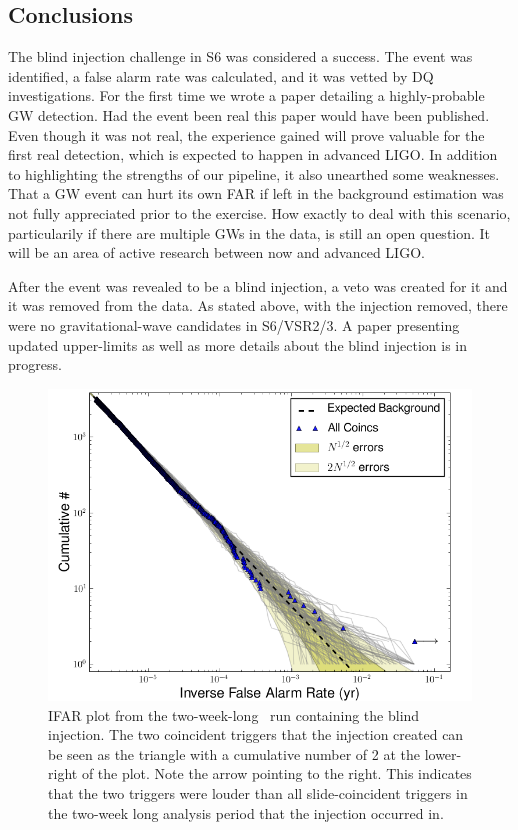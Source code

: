 \subsection{Conclusions}

The blind injection challenge in S6 was considered a success. The event was
identified, a false alarm rate was calculated, and it was vetted by \ac{DQ}
investigations. For the first time we wrote a paper detailing a highly-probable
\ac{GW} detection. Had the event been real this paper would have been
published. Even though it was not real, the experience gained will prove
valuable for the first real detection, which is expected to happen in  advanced
LIGO. In addition to highlighting the strengths of our pipeline, it also
unearthed some weaknesses. That a \ac{GW} event can hurt its own \ac{FAR} if
left in the background estimation was not fully appreciated prior to the
exercise. How exactly to deal with this scenario, particularily if there are
multiple \acp{GW} in the data, is still an open question. It will be an area of
active research between now and advanced LIGO.

After the event was revealed to be a blind injection, a veto was created for it
and it was removed from the data. As stated above, with the injection removed,
there were no gravitational-wave candidates in S6/VSR2/3. A paper presenting
updated upper-limits as well as more details about the blind injection is in
progress.

\begin{figure}[p]
\center
\includegraphics[width=6in]{figures/big_dog/H1L1V1-ligolw_cbc_plotifar_FULL_DATA_CAT_4_VETO_cumhist_combined_ifar_ALL_DATA_PLOTTED_OPEN_BOX-967593543-1209744.png}
\caption{IFAR plot from the two-week-long \ihope~run containing the blind
injection. The two coincident triggers that the injection created can be seen
as the triangle with a cumulative number of 2 at the lower-right of the plot.
Note the arrow pointing to the right. This indicates that the two triggers were
louder than all slide-coincident triggers in the two-week long analysis period
that the injection occurred in.}
\label{fig:big_dog-ifar}
\end{figure}


